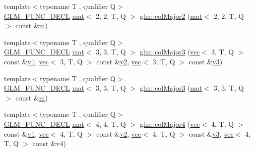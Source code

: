 \begin{DoxyCompactItemize}
\item 
{\footnotesize template$<$typename T , qualifier Q$>$ }\\\mbox{\hyperlink{setup_8hpp_ab2d052de21a70539923e9bcbf6e83a51}{G\+L\+M\+\_\+\+F\+U\+N\+C\+\_\+\+D\+E\+CL}} \mbox{\hyperlink{structglm_1_1mat}{mat}}$<$ 2, 2, T, Q $>$ \mbox{\hyperlink{group__gtx__matrix__major__storage_gafc25fd44196c92b1397b127aec1281ab}{glm\+::col\+Major2}} (\mbox{\hyperlink{structglm_1_1mat}{mat}}$<$ 2, 2, T, Q $>$ const \&\mbox{\hyperlink{_s_d_l__opengl__glext_8h_af593500c283bf1a787a6f947f503a5c2}{m}})
\item 
{\footnotesize template$<$typename T , qualifier Q$>$ }\\\mbox{\hyperlink{setup_8hpp_ab2d052de21a70539923e9bcbf6e83a51}{G\+L\+M\+\_\+\+F\+U\+N\+C\+\_\+\+D\+E\+CL}} \mbox{\hyperlink{structglm_1_1mat}{mat}}$<$ 3, 3, T, Q $>$ \mbox{\hyperlink{group__gtx__matrix__major__storage_ga1e25b72b085087740c92f5c70f3b051f}{glm\+::col\+Major3}} (\mbox{\hyperlink{structglm_1_1vec}{vec}}$<$ 3, T, Q $>$ const \&\mbox{\hyperlink{_s_d_l__opengl__glext_8h_a435c176a02c061b43e19bdf7c86cceae}{v1}}, \mbox{\hyperlink{structglm_1_1vec}{vec}}$<$ 3, T, Q $>$ const \&\mbox{\hyperlink{_s_d_l__opengl__glext_8h_a0928f6d0f0f794ba000a21dfae422136}{v2}}, \mbox{\hyperlink{structglm_1_1vec}{vec}}$<$ 3, T, Q $>$ const \&\mbox{\hyperlink{_s_d_l__opengl__glext_8h_acc806b31cbf466ceba6555983d8b814d}{v3}})
\item 
{\footnotesize template$<$typename T , qualifier Q$>$ }\\\mbox{\hyperlink{setup_8hpp_ab2d052de21a70539923e9bcbf6e83a51}{G\+L\+M\+\_\+\+F\+U\+N\+C\+\_\+\+D\+E\+CL}} \mbox{\hyperlink{structglm_1_1mat}{mat}}$<$ 3, 3, T, Q $>$ \mbox{\hyperlink{group__gtx__matrix__major__storage_ga86bd0656e787bb7f217607572590af27}{glm\+::col\+Major3}} (\mbox{\hyperlink{structglm_1_1mat}{mat}}$<$ 3, 3, T, Q $>$ const \&\mbox{\hyperlink{_s_d_l__opengl__glext_8h_af593500c283bf1a787a6f947f503a5c2}{m}})
\item 
{\footnotesize template$<$typename T , qualifier Q$>$ }\\\mbox{\hyperlink{setup_8hpp_ab2d052de21a70539923e9bcbf6e83a51}{G\+L\+M\+\_\+\+F\+U\+N\+C\+\_\+\+D\+E\+CL}} \mbox{\hyperlink{structglm_1_1mat}{mat}}$<$ 4, 4, T, Q $>$ \mbox{\hyperlink{group__gtx__matrix__major__storage_gaf4aa6c7e17bfce41a6c13bf6469fab05}{glm\+::col\+Major4}} (\mbox{\hyperlink{structglm_1_1vec}{vec}}$<$ 4, T, Q $>$ const \&\mbox{\hyperlink{_s_d_l__opengl__glext_8h_a435c176a02c061b43e19bdf7c86cceae}{v1}}, \mbox{\hyperlink{structglm_1_1vec}{vec}}$<$ 4, T, Q $>$ const \&\mbox{\hyperlink{_s_d_l__opengl__glext_8h_a0928f6d0f0f794ba000a21dfae422136}{v2}}, \mbox{\hyperlink{structglm_1_1vec}{vec}}$<$ 4, T, Q $>$ const \&\mbox{\hyperlink{_s_d_l__opengl__glext_8h_acc806b31cbf466ceba6555983d8b814d}{v3}}, \mbox{\hyperlink{structglm_1_1vec}{vec}}$<$ 4, T, Q $>$ const \&v4)

\end{DoxyCompactItemize}
